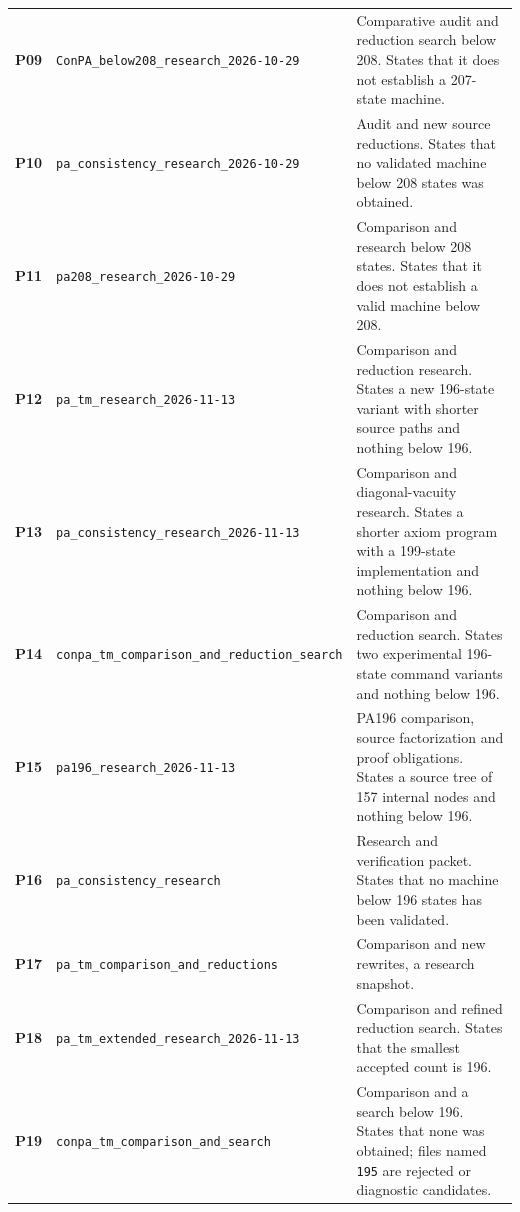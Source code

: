 \begin{longtable}{@{}>{\raggedright\arraybackslash}p{.055\linewidth}>{\raggedright\arraybackslash}p{.355\linewidth}>{\raggedright\arraybackslash}p{.55\linewidth}@{}}
\hypertarget{packet-P09}{\textbf{P09}} & \nolinkurl{ConPA_below208_research_2026-10-29} & Comparative audit and reduction search below 208. States that it does not establish a 207-state machine.\\[3pt]
\hypertarget{packet-P10}{\textbf{P10}} & \nolinkurl{pa_consistency_research_2026-10-29} & Audit and new source reductions. States that no validated machine below 208 states was obtained.\\[3pt]
\hypertarget{packet-P11}{\textbf{P11}} & \nolinkurl{pa208_research_2026-10-29} & Comparison and research below 208 states. States that it does not establish a valid machine below 208.\\[3pt]
\hypertarget{packet-P12}{\textbf{P12}} & \nolinkurl{pa_tm_research_2026-11-13} & Comparison and reduction research. States a new 196-state variant with shorter source paths and nothing below 196.\\[3pt]
\hypertarget{packet-P13}{\textbf{P13}} & \nolinkurl{pa_consistency_research_2026-11-13} & Comparison and diagonal-vacuity research. States a shorter axiom program with a 199-state implementation and nothing below 196.\\[3pt]
\hypertarget{packet-P14}{\textbf{P14}} & \nolinkurl{conpa_tm_comparison_and_reduction_search} & Comparison and reduction search. States two experimental 196-state command variants and nothing below 196.\\[3pt]
\hypertarget{packet-P15}{\textbf{P15}} & \nolinkurl{pa196_research_2026-11-13} & PA196 comparison, source factorization and proof obligations. States a source tree of 157 internal nodes and nothing below 196.\\[3pt]
\hypertarget{packet-P16}{\textbf{P16}} & \nolinkurl{pa_consistency_research} & Research and verification packet. States that no machine below 196 states has been validated.\\[3pt]
\hypertarget{packet-P17}{\textbf{P17}} & \nolinkurl{pa_tm_comparison_and_reductions} & Comparison and new rewrites, a research snapshot.\\[3pt]
\hypertarget{packet-P18}{\textbf{P18}} & \nolinkurl{pa_tm_extended_research_2026-11-13} & Comparison and refined reduction search. States that the smallest accepted count is 196.\\[3pt]
\hypertarget{packet-P19}{\textbf{P19}} & \nolinkurl{conpa_tm_comparison_and_search} & Comparison and a search below 196. States that none was obtained; files named \nolinkurl{195} are rejected or diagnostic candidates.\\[3pt]

\end{longtable}
